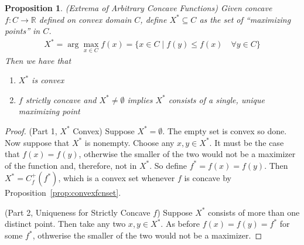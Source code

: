 \documentclass[12pt]{article}
\numberwithin{equation}{section} %
\theoremstyle{plain}
\newtheorem{prop}[thm]{Proposition}
\theoremstyle{definition}
\theoremstyle{remark}
\newcommand{\R}{\mathbb{R}}
\begin{document}
\begin{prop}{\emph{(Extrema of Arbitrary Concave Functions)}}
Given concave $f:C\rightarrow \R$ defined on convex domain $C$, define
$X^*\subseteq C$ as the set of ``maximizing points'' in $C$.
\begin{align*}
  X^* = \arg\max_{x\in C} f(x)
  = \{ x \in C \; | \; f(y) \leq f(x) \quad \forall y \in C\}
\end{align*}
Then we have that
\begin{enumerate}
  \item $X^*$ is convex
  \item $f$ strictly concave and $X^*\neq \emptyset$ implies $X^*$
    consists of a single, \emph{unique} maximizing point
\end{enumerate}
\end{prop}
\begin{proof}


(Part 1, $X^*$ Convex) Suppose $X^*=\emptyset$. The empty set is convex
so done.  Now suppose that $X^*$ is nonempty. Choose any $x,y\in X^*$.
It must be the case that $f(x) = f(y)$, otherwise the smaller of the two
would not be a maximizer of the function and, therefore, not in $X^*$.
So define $f^* = f(x) = f(y)$.  Then $X^* = C^+_f(f^*)$, which is a
convex set whenever $f$ is concave by
Proposition~\ref{prop:convexfcnset}.

(Part 2, Uniqueness for Strictly Concave $f$)
Suppose $X^*$ consists of more than one distinct point. Then take any
two $x,y\in X^*$. As before $f(x)=f(y)=f^*$ for some $f^*$, othwerise
the smaller of the two would not be a maximizer.


\end{proof}
\end{document}
